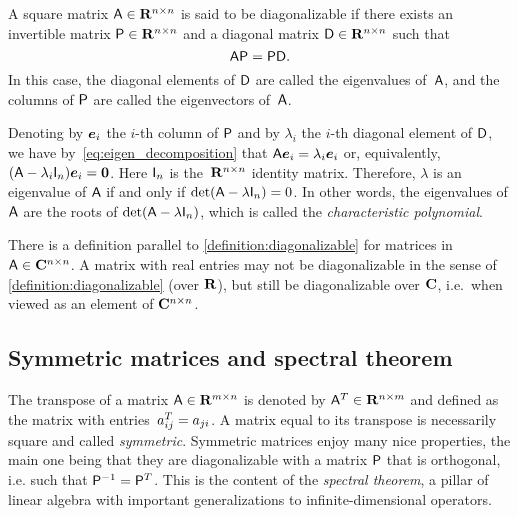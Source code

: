 \begin{definition}
    \label{definition:diagonalizable}
    A square matrix $\mathsf A \in \mathbf R^{n \times n}$ is said to be diagonalizable if there exists an invertible matrix $\mathsf P \in \mathbf R^{n \times n}$
    and a diagonal matrix $\mathsf D \in \mathbf R^{n \times n}$ such that
    \begin{equation}
        \label{eq:eigen_decomposition}
        \mathsf A \mathsf P = \mathsf P \mathsf D.
    \end{equation}
    In this case,
    the diagonal elements of $\mathsf D$ are called the eigenvalues of~$\mathsf A$,
    and the columns of $\mathsf P$ are called the eigenvectors of~$\mathsf A$.
\end{definition}
Denoting by $\mathbf{\boldsymbol{e}}_i$ the $i$-th column of $\mathsf P$ and by $\lambda_i$ the $i$-th diagonal element of $\mathsf D$,
we have by~\eqref{eq:eigen_decomposition} that $\mathsf A \mathbf{\boldsymbol{e}}_i = \lambda_i \mathbf{\boldsymbol{e}}_i$ or,
equivalently, $(\mathsf A - \lambda_i \mathsf I_n) \mathbf{\boldsymbol{e}}_i = \mathbf{\boldsymbol{0}}$.
Here $\mathsf I_n$ is the~$\mathbf R^{n \times n}$ identity matrix.
Therefore, $\lambda$ is an eigenvalue of $\mathsf A$ if and only if $\det(\mathsf A - \lambda \mathsf I_n) = 0$.
In other words, the eigenvalues of $\mathsf A$ are the roots of $\det(\mathsf A - \lambda \mathsf I_n)$,
which is called the \emph{characteristic polynomial}.

\begin{remark}
There is a definition parallel to \cref{definition:diagonalizable} for matrices in $\mathsf A \in \mathbf C^{n \times n}$.
A matrix with real entries may not be diagonalizable in the sense of \cref{definition:diagonalizable} (over $\mathbf R$),
but still be diagonalizable over $\mathbf C$,
i.e.\ when viewed as an element of $\mathbf C^{n \times n}$.
\end{remark}

\subsection*{Symmetric matrices and spectral theorem}%
The transpose of a matrix $\mathsf A \in \mathbf R^{m \times n}$ is denoted by $\mathsf A^T \in \mathbf R^{n \times m}$
and defined as the matrix with entries~$a^T_{ij} = a_{ji}$.
A matrix equal to its transpose is necessarily square and called \emph{symmetric}.
Symmetric matrices enjoy many nice properties,
the main one being that they are diagonalizable with a matrix $\mathsf P$ that is orthogonal,
i.e. such that $\mathsf P^{-1} = \mathsf P^T$.
This is the content of the \emph{spectral theorem},
a pillar of linear algebra with important generalizations to infinite-dimensional operators.

